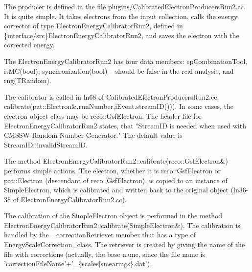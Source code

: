 \documentclass[11pt]{article}
\begin{document}
The producer is defined in the file
plugins/CalibratedElectronProducersRun2.cc. It is quite simple. It
takes electrons from the input collection, calls the energy corrector
of type ElectronEnergyCalibratorRun2, defined in
\{interface/src\}ElectronEnergyCalibratorRun2, and saves the electron
with the corrected energy.

The ElectronEnergyCalibratorRun2 has four data members:
epCombinationTool, isMC(bool), synchronization(bool) -- should be
false in the real analysis, and rng(TRandom).

The calibrator is called in ln68 of
CalibratedElectronProducersRun2.cc:
calibrate(pat::Electron\&,runNumber,iEvent.streamID())). In some cases,
the electron object class may be reco::GsfElectron. The header file
for ElectronEnergyCalibratorRun2 states, that "StreamID is needed when
used with CMSSW Random Number Generator." The default value is
StreamID::invalidStreamID.

The method
ElectronEnergyCalibratorRun2::calibrate(reco::GsfElectron\&)
performs simple actions.
The electron, whether it is reco::GsfElectron or pat::Electron
(descendant of reco::GsfElectron), is copied to an instance of
SimpleElectron, which is calibrated and written back to the original
object (ln36-38 of ElectronEnergyCalibratorRun2.cc).

The calibration of the SimpleElectron object is performed in the
method ElectronEnergyCalibratorRun2::calibrate(SimpleElectron\&). The
calibration is handled by the \_correctionRetriever member that has a
type of EnergyScaleCorrection\_class. The retriever is created by
giving the name of the file with corrections (actually, the base name,
since the file name is
'correctionFileName'+'\_\{scales$\vert$smearings\}.dat').
\end{document}
